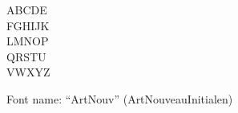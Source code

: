 \documentclass[a4paper]{article}
\begin{document}
\begin{center}
\fontsize{60pt}{72pt}
  ABCDE \\
  FGHIJK \\
  LMNOP \\
  QRSTU \\
  VWXYZ \\
\end{center}
\vfill
\begin{center}
Font name: ``ArtNouv'' (ArtNouveauInitialen)
\end{center}
\end{document}
